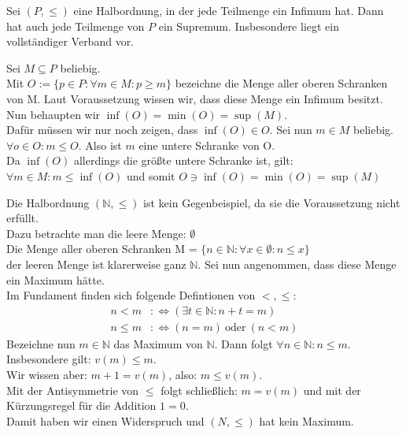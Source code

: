 \begin{exercise}
    Sei $(P,\leq)$ eine Halbordnung, in der jede Teilmenge ein Infimum hat.
    Dann hat auch jede Teilmenge von $P$ ein Supremum. Insbesondere liegt ein
    vollständiger Verband vor.
\end{exercise}
\begin{solution}
Sei $M \subseteq P$ beliebig. \\
Mit $O := \{p \in P: \forall m \in M: p \geq m\}$
bezeichne die Menge aller oberen Schranken von M. Laut Voraussetzung wissen wir,
dass diese Menge ein Infimum besitzt. Nun behaupten wir $\inf(O)  = \min(O) = \sup(M)$. \\
Dafür müssen wir nur noch zeigen, dass $\inf(O) \in O$. Sei nun $m \in M$ beliebig. \\
$\forall o \in O: m \leq O$. Also ist $m$ eine untere Schranke von O. \\
Da $\inf(O)$ allerdings die größte untere Schranke ist, gilt: \\
$\forall m \in M: m \leq \inf(O)$ und somit $O \ni \inf(O) = \min(O) = \sup(M)$



Die Halbordnung $(\mathbb{N}, \leq)$ ist kein Gegenbeispiel, da sie die Voraussetzung
nicht erfüllt. \\
Dazu betrachte man die leere Menge: $\emptyset$\\
Die Menge aller oberen Schranken M = $\{n \in \mathbb{N}: \forall x \in \emptyset: n \leq x \}$\\
der leeren Menge ist klarerweise ganz $\mathbb{N}$.
Sei nun angenommen, dass diese Menge ein Maximum hätte. \\
Im Fundament finden sich folgende Defintionen von $<, \leq$:
\begin{align*}
  n < m &: \iff (\exists t \in \mathbb{N}: n + t = m) \\
  n \leq m &: \iff (n = m) ~\text{oder}~ (n < m)
\end{align*}
Bezeichne nun $m \in \mathbb{N}$ das Maximum von $\mathbb{N}$.
Dann folgt $\forall n \in \mathbb{N}: n \leq m$. \\
Insbesondere gilt: $v(m) \leq m$. \\
Wir wissen aber: $m + 1 = v(m)$, also: $m \leq v(m)$. \\
Mit der Antisymmetrie von $\leq$ folgt schließlich: $m = v(m)$
und mit der Kürzungsregel für die Addition $1 = 0$. \\
Damit haben wir einen Widerspruch und $(N, \leq)$ hat kein Maximum.
\end{solution}
